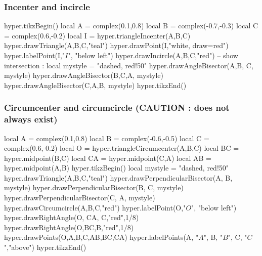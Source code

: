 \documentclass{article}
\begin{document}
\subsubsection{Incenter and incircle}
\begin{codeandresult}
\begin{luacode*}
hyper.tikzBegin()
local A = complex(0.1,0.8)
local B = complex(-0.7,-0.3)
local C = complex(0.6,-0.2)
local I = hyper.triangleIncenter(A,B,C)
hyper.drawTriangle(A,B,C,"teal")
hyper.drawPoint(I,"white, draw=red")
hyper.labelPoint(I,"$I$", "below left")
hyper.drawIncircle(A,B,C,"red")
-- show intersection : 
local mystyle = "dashed, red!50"
hyper.drawAngleBisector(A,B, C, mystyle)
hyper.drawAngleBisector(B,C,A, mystyle)
hyper.drawAngleBisector(C,A,B, mystyle)
hyper.tikzEnd()
\end{luacode*}
\end{codeandresult}

\subsubsection{Circumcenter and circumcircle (CAUTION : does not always exist)}
\begin{codeandresult}
\begin{luacode*}
local A = complex(0.1,0.8)
local B = complex(-0.6,-0.5)
local C = complex(0.6,-0.2)
local O = hyper.triangleCircumcenter(A,B,C)
local BC = hyper.midpoint(B,C)
local CA = hyper.midpoint(C,A)
local AB = hyper.midpoint(A,B)
hyper.tikzBegin()
local mystyle = "dashed, red!50"
hyper.drawTriangle(A,B,C,"teal")
hyper.drawPerpendicularBisector(A, B, mystyle)
hyper.drawPerpendicularBisector(B, C, mystyle)
hyper.drawPerpendicularBisector(C, A, mystyle)
hyper.drawCircumcircle(A,B,C,"red")
hyper.labelPoint(O,"$O$", "below left")
hyper.drawRightAngle(O, CA, C,"red",1/8)
hyper.drawRightAngle(O,BC,B,"red",1/8)
hyper.drawPoints(O,A,B,C,AB,BC,CA)
hyper.labelPoints(A, "$A$", B, "$B$", C, "$C$","above")
hyper.tikzEnd()
\end{luacode*}
\end{codeandresult}
\end{document}
